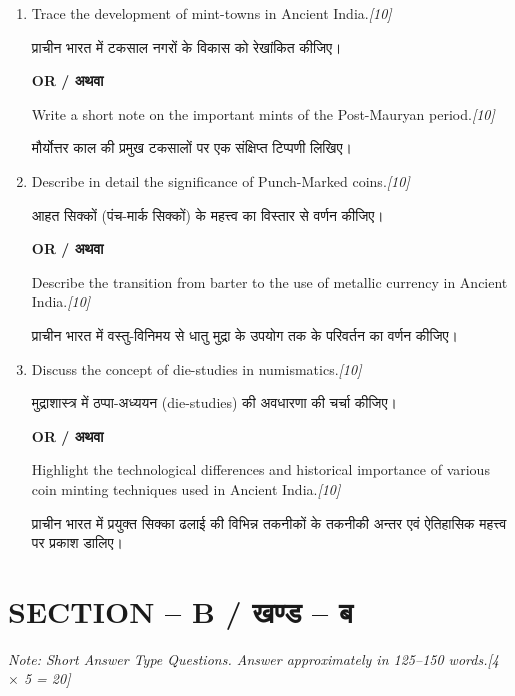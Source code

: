 \documentclass[11pt,a4paper]{article}
\newcommand{\pts}[1]{\hfill \textit{[#1]}}
\begin{document}
\begin{enumerate}[label=\textbf{\arabic*.},leftmargin=*,itemsep=12pt]

  \item Trace the development of mint-towns in Ancient India.\pts{10}
  
  प्राचीन भारत में टकसाल नगरों के विकास को रेखांकित कीजिए।

  \begin{center}\textbf{OR / अथवा}\end{center}

  Write a short note on the important mints of the Post-Mauryan period.\pts{10}
  
  मौर्योत्तर काल की प्रमुख टकसालों पर एक संक्षिप्त टिप्पणी लिखिए।

  \item Describe in detail the significance of Punch-Marked coins.\pts{10}
  
  आहत सिक्कों (पंच-मार्क सिक्कों) के महत्त्व का विस्तार से वर्णन कीजिए।

  \begin{center}\textbf{OR / अथवा}\end{center}

  Describe the transition from barter to the use of metallic currency in Ancient India.\pts{10}
  
  प्राचीन भारत में वस्तु-विनिमय से धातु मुद्रा के उपयोग तक के परिवर्तन का वर्णन कीजिए।

  \item Discuss the concept of die-studies in numismatics.\pts{10}
  
  मुद्राशास्त्र में ठप्पा-अध्ययन (die-studies) की अवधारणा की चर्चा कीजिए।

  \begin{center}\textbf{OR / अथवा}\end{center}

  Highlight the technological differences and historical importance of various coin minting techniques used in Ancient India.\pts{10}
  
  प्राचीन भारत में प्रयुक्त सिक्का ढलाई की विभिन्न तकनीकों के तकनीकी अन्तर एवं ऐतिहासिक महत्त्व पर प्रकाश डालिए।

\end{enumerate}

\bigskip

\section*{SECTION -- B / खण्ड -- ब}
\noindent \textit{Note: Short Answer Type Questions. Answer approximately in 125--150 words.}\pts{4 $\times$ 5 = 20}
\end{document}

